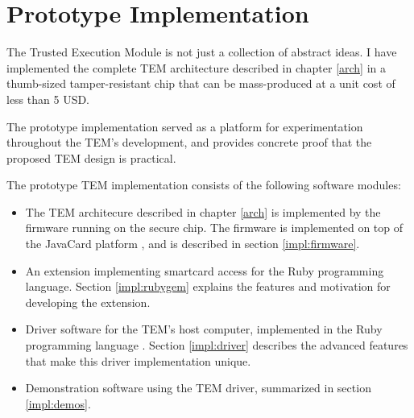 \chapter{Prototype Implementation}\label{impl}
The Trusted Execution Module is not just a collection of abstract ideas. I have
implemented the complete TEM architecture described in chapter \ref{arch} in a
thumb-sized tamper-resistant chip that can be mass-produced at a unit cost of
less than 5 USD.

The prototype implementation served as a platform for experimentation
throughout the TEM's development, and provides concrete proof that the
proposed TEM design is practical.

The prototype TEM implementation consists of the following software modules:
\begin{itemize}
  \item The TEM architecure described in chapter \ref{arch} is implemented by
  the firmware running on the secure chip. The firmware is implemented on
  top of the JavaCard platform \cite{microsystems2003jcp}, and is described in
  section \ref{impl:firmware}.
  \item An extension implementing smartcard access for the Ruby programming
  language. Section \ref{impl:rubygem} explains the features and motivation
  for developing the extension. 
  \item Driver software for the TEM's host computer, implemented in the Ruby
  programming language \cite{flanagan2008ruby}. Section \ref{impl:driver}
  describes the advanced features that make this driver implementation unique.
  \item Demonstration software using the TEM driver, summarized in section
  \ref{impl:demos}.
\end{itemize}

